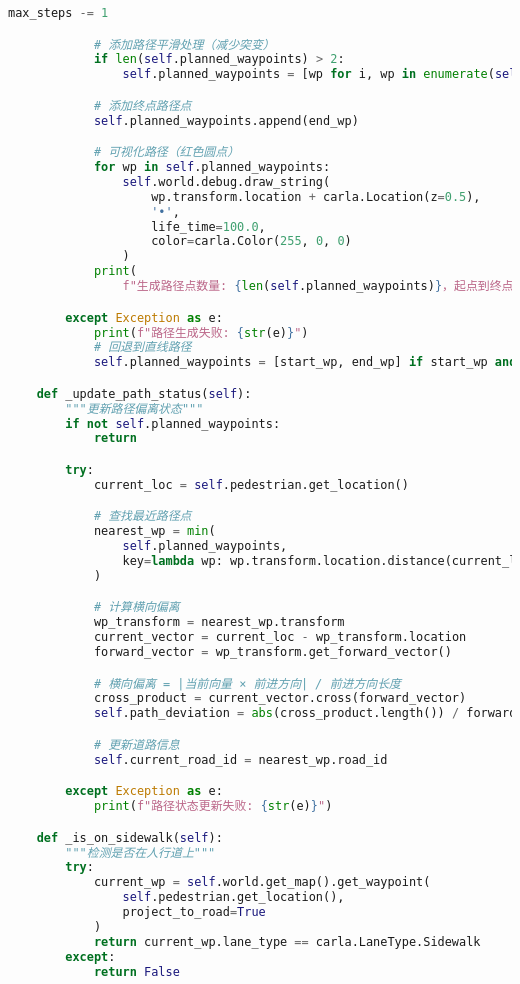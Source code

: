 \begin{lstlisting}[language=Python]
                max_steps -= 1

            # 添加路径平滑处理（减少突变）
            if len(self.planned_waypoints) > 2:
                self.planned_waypoints = [wp for i, wp in enumerate(self.planned_waypoints) if i % 2 == 0]

            # 添加终点路径点
            self.planned_waypoints.append(end_wp)

            # 可视化路径（红色圆点）
            for wp in self.planned_waypoints:
                self.world.debug.draw_string(
                    wp.transform.location + carla.Location(z=0.5),
                    '•',
                    life_time=100.0,
                    color=carla.Color(255, 0, 0)
                )
            print(
                f"生成路径点数量: {len(self.planned_waypoints)}，起点到终点距离: {start_loc.distance(end_loc):.1f}m")

        except Exception as e:
            print(f"路径生成失败: {str(e)}")
            # 回退到直线路径
            self.planned_waypoints = [start_wp, end_wp] if start_wp and end_wp else []

    def _update_path_status(self):
        """更新路径偏离状态"""
        if not self.planned_waypoints:
            return

        try:
            current_loc = self.pedestrian.get_location()

            # 查找最近路径点
            nearest_wp = min(
                self.planned_waypoints,
                key=lambda wp: wp.transform.location.distance(current_loc)
            )

            # 计算横向偏离
            wp_transform = nearest_wp.transform
            current_vector = current_loc - wp_transform.location
            forward_vector = wp_transform.get_forward_vector()

            # 横向偏离 = |当前向量 × 前进方向| / 前进方向长度
            cross_product = current_vector.cross(forward_vector)
            self.path_deviation = abs(cross_product.length()) / forward_vector.length()

            # 更新道路信息
            self.current_road_id = nearest_wp.road_id

        except Exception as e:
            print(f"路径状态更新失败: {str(e)}")

    def _is_on_sidewalk(self):
        """检测是否在人行道上"""
        try:
            current_wp = self.world.get_map().get_waypoint(
                self.pedestrian.get_location(),
                project_to_road=True
            )
            return current_wp.lane_type == carla.LaneType.Sidewalk
        except:
            return False


\end{lstlisting}
